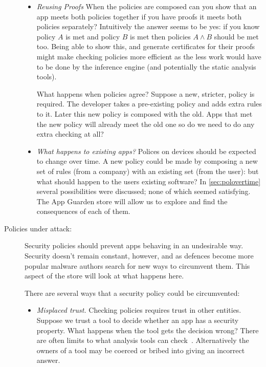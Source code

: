 \documentclass[a4paper,sfsidenotes]{%
  article%
}
\begin{document}
\begin{description}
\begin{itemize}
      \item \emph{Reusing Proofs}
        When the policies are composed can you show that an app meets both
        policies together if you have proofs it meets both policies separately?
        Intuitively the answer seems to be yes: if you know policy $A$ is met
        and policy $B$ is met then policies $A\wedge B$ should be met too.
        Being able to show this, and generate certificates for their proofs
        might make checking policies more efficient as the less work would have
        to be done by the inference engine (and potentially the static analysis
        tools).

        What happens when policies agree? Suppose a new, stricter,
        policy is required.  The developer takes a pre-existing policy and adds
        extra rules to it.  Later this new policy is composed with the old.
        Apps that met the new policy will already meet the old one so do we need
        to do any extra checking at all?  

      \item \emph{What happens to existing apps?} Polices on devices should be
        expected to change over time.  A new policy could be made by composing a
        new set of rules (from a company) with an existing set (from the user):
        but what should happen to the users existing software?  In
        \autoref{sec:polovertime} several possibilities were discussed; none
        of which seemed satisfying.  The App Guarden store will allow us to
        explore and find the consequences of each of them.
        
    \end{itemize}

  \item[Policies under attack:]  Security policies should prevent apps behaving
    in an undesirable way.  Security doesn't remain constant, however, and as
    defences become more popular malware authors search for new ways to
    circumvent them.  This aspect of the store will look at what happens here.

    There are several ways that a security policy could be circumvented:

    \begin{itemize} 
      
      \item \emph{Misplaced trust.}  Checking policies requires trust in other
        entities.  Suppose we trust a tool to decide whether an app has a
        security property.  What happens when the tool gets the decision wrong?
        There are often limits to what analysis tools can
        check~\cite{Livshits:ww}.  Alternatively the owners of a tool may be
        coerced or bribed into giving an incorrect answer.  
        

\end{itemize}
\end{description}
\end{document}
